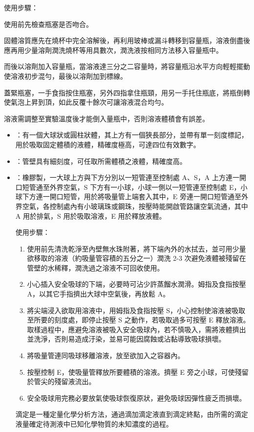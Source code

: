 \documentclass[a4paper,12pt]{article}
\begin{document}
使用步驟：
\ben
\item 使用前先檢查瓶塞是否吻合。
\item 固體溶質應先在燒杯中完全溶解後，再利用玻棒或漏斗轉移到容量瓶，溶液倒盡後應再用少量溶劑潤洗燒杯等用具數次，潤洗液按相同方法移入容量瓶中。
\item 而後以溶劑加入容量瓶，當溶液達三分之二容量時，將容量瓶沿水平方向輕輕擺動使溶液初步混勻，最後以溶劑加到標線。
\item 蓋緊瓶塞，一手食指按住瓶塞，另外四指拿住瓶頸，用另一手托住瓶底，將瓶倒轉使氣泡上昇到頂，如此反覆十餘次可讓溶液混合均勻。
\item 溶液需調整至實驗溫度後才能倒入量瓶中，否則溶液體積會有誤差。
\een
{}
\begin{itemize}
\item {}：有一個大球狀或圓柱狀體，其上方有一個狹長部分，並帶有單一刻度標記，用於吸取固定體積的液體，精確度極高，可達四位有效數字。
\item {}：管壁具有細刻度，可任取所需體積之液體，精確度高。
\item {}：橡膠製，一大球上方與下方分別以一短管連至控制處 A、S，A 上方連一開口短管通至外界空氣，S 下方有一小球，小球一側以一短管連至控制處 E，小球下方連一開口短管，用於將吸量管上端套入其中，E 旁連一開口短管通至外界空氣，各控制處內有小玻璃珠或鋼珠，按壓時能開啟管路讓空氣流通，其中 A 用於排氣，S 用於吸取溶液，E 用於釋放液體。
\eit

使用步驟：
\begin{enumerate}
\item 使用前先清洗乾淨至內壁無水珠附著，將下端內外的水拭去，並可用少量欲移取的溶液（約吸量管容積的五分之一）潤洗 2-3 次避免液體被殘留在管壁的水稀釋，潤洗過之溶液不可回收使用。
\item 小心插入安全吸球的下端，必要時可沾少許蒸餾水潤滑。姆指及食指按壓 A，以其它手指擠出大球中空氣後，再放鬆 A。
\item 將尖端浸入欲取用溶液中，用姆指及食指按壓 S，小心控制使溶液被吸取至所要的刻度處，即停止按壓 S 之動作，若吸取過多可按壓 E 釋放溶液。取樣過程中，應避免溶液被吸入安全吸球內，若不慎吸入，需將液體擠出並洗淨，否則易造成汙染，並易可能因腐蝕或沾黏導致吸球損壞。
\item 將吸量管連同吸球移離溶液，放至欲加入之容器內。
\item 按壓控制 E，使吸量管釋放所要體積的溶液。擠壓 E 旁之小球，可使殘留於管尖的殘留液流出。
\item 安全吸球用完務必要放氣使吸球恢復原狀，避免吸球因彈性疲乏而損壞。
\end{enumerate}
滴定是一種定量化學分析方法，通過滴加滴定液直到滴定終點，由所需的滴定液量確定待測液中已知化學物質的未知濃度的過程。


\end{itemize}
\end{document}
